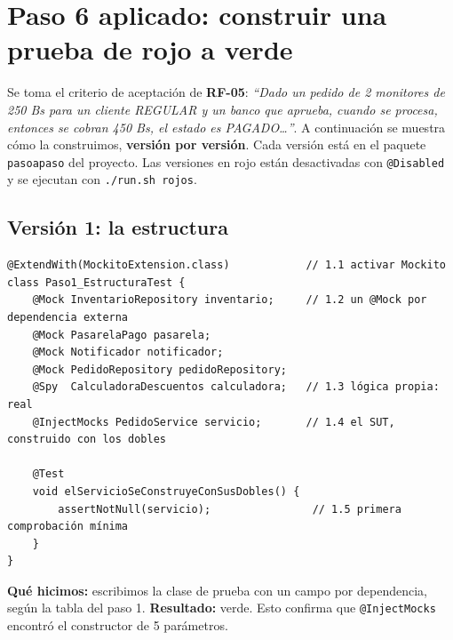 \documentclass[11pt,a4paper,oneside]{report}
\newcommand{\code}[1]{\texttt{#1}}
\begin{document}
\section{Paso 6 aplicado: construir una prueba de rojo a verde}
Se toma el criterio de aceptación de \textbf{RF-05}: \emph{``Dado un pedido de 2 monitores de 250 Bs para un cliente REGULAR y un banco que aprueba, cuando se procesa, entonces se cobran 450 Bs, el estado es PAGADO\ldots''}. A continuación se muestra cómo la construimos, \textbf{versión por versión}. Cada versión está en el paquete \code{pasoapaso} del proyecto. Las versiones en rojo están desactivadas con \code{@Disabled} y se ejecutan con \code{./run.sh rojos}.

\subsection{Versión 1: la estructura}
\begin{lstlisting}[caption={\code{Paso1\_EstructuraTest}: preparar el escenario}]
@ExtendWith(MockitoExtension.class)            // 1.1 activar Mockito
class Paso1_EstructuraTest {
    @Mock InventarioRepository inventario;     // 1.2 un @Mock por dependencia externa
    @Mock PasarelaPago pasarela;
    @Mock Notificador notificador;
    @Mock PedidoRepository pedidoRepository;
    @Spy  CalculadoraDescuentos calculadora;   // 1.3 lógica propia: real
    @InjectMocks PedidoService servicio;       // 1.4 el SUT, construido con los dobles

    @Test
    void elServicioSeConstruyeConSusDobles() {
        assertNotNull(servicio);                // 1.5 primera comprobación mínima
    }
}
\end{lstlisting}
\textbf{Qué hicimos:} escribimos la clase de prueba con un campo por dependencia, según la tabla del paso 1. \textbf{Resultado:} \textcolor{verde}{verde}. Esto confirma que \code{@InjectMocks} encontró el constructor de 5 parámetros.
\end{document}
